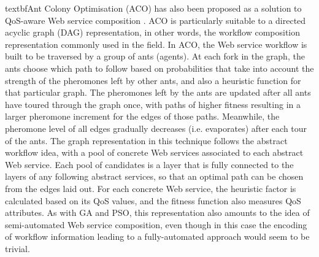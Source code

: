 textbf{Ant Colony Optimisation (ACO)} has also been proposed as a solution to QoS-aware Web service composition \cite{zhang2010qos}. ACO is particularly suitable to a directed acyclic graph (DAG) representation, in other words, the workflow composition representation commonly used in the field. In ACO, the Web service workflow is built to be traversed by a group of ants (agents). At each fork in the graph, the ants choose which path to follow based on probabilities that take into account the strength of the pheromones left by other ants, and also a heuristic function for that particular graph. The pheromones left by the ants are updated after all ants have toured through the graph once, with paths of higher fitness resulting in a larger pheromone increment for the edges of those paths. Meanwhile, the pheromone level of all edges gradually decreases (i.e. evaporates) after each tour of the ants. The graph representation in this technique follows the abstract workflow idea, with a pool of concrete Web services associated to each abstract Web service. Each pool of candidates is a layer that is fully connected to the layers of any following abstract services, so that an optimal path can be chosen from the edges laid out. For each concrete Web service, the heuristic factor is calculated based on its QoS values, and the fitness function also measures QoS attributes. As with GA and PSO, this representation also amounts to the idea of semi-automated Web service composition, even though in this case the encoding of workflow information leading to a fully-automated approach would seem to be trivial.

